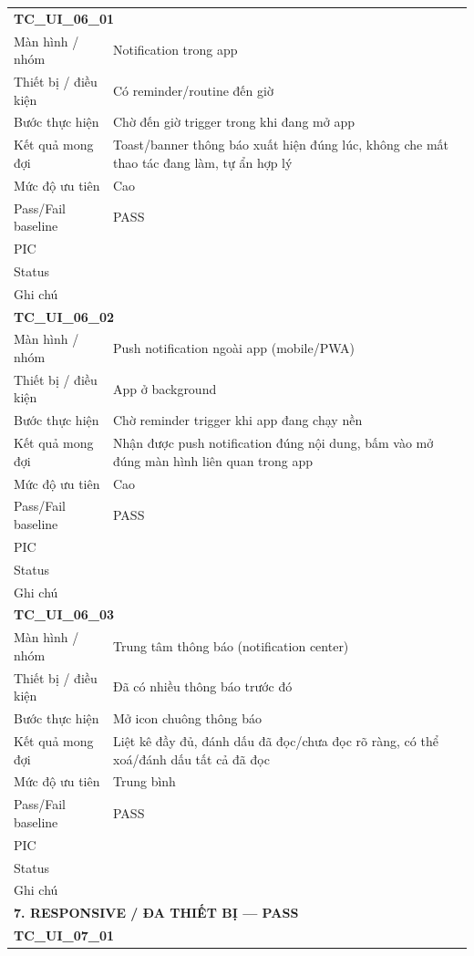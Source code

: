 \documentclass[12pt,a4paper]{article}
\begin{document}
\begin{longtable}{p{3.0cm}p{11.5cm}}
\multicolumn{2}{l}{\textbf{TC\_UI\_06\_01}} \\
Màn hình / nhóm & Notification trong app \\
Thiết bị / điều kiện & Có reminder/routine đến giờ \\
Bước thực hiện & Chờ đến giờ trigger trong khi đang mở app \\
Kết quả mong đợi & Toast/banner thông báo xuất hiện đúng lúc, không che mất thao tác đang làm, tự ẩn hợp lý \\
Mức độ ưu tiên & Cao \\
Pass/Fail baseline & PASS \\
PIC &  \\
Status &  \\
Ghi chú &  \\
\midrule
\multicolumn{2}{l}{\textbf{TC\_UI\_06\_02}} \\
Màn hình / nhóm & Push notification ngoài app (mobile/PWA) \\
Thiết bị / điều kiện & App ở background \\
Bước thực hiện & Chờ reminder trigger khi app đang chạy nền \\
Kết quả mong đợi & Nhận được push notification đúng nội dung, bấm vào mở đúng màn hình liên quan trong app \\
Mức độ ưu tiên & Cao \\
Pass/Fail baseline & PASS \\
PIC &  \\
Status &  \\
Ghi chú &  \\
\midrule
\multicolumn{2}{l}{\textbf{TC\_UI\_06\_03}} \\
Màn hình / nhóm & Trung tâm thông báo (notification center) \\
Thiết bị / điều kiện & Đã có nhiều thông báo trước đó \\
Bước thực hiện & Mở icon chuông thông báo \\
Kết quả mong đợi & Liệt kê đầy đủ, đánh dấu đã đọc/chưa đọc rõ ràng, có thể xoá/đánh dấu tất cả đã đọc \\
Mức độ ưu tiên & Trung bình \\
Pass/Fail baseline & PASS \\
PIC &  \\
Status &  \\
Ghi chú &  \\
\midrule
\multicolumn{2}{l}{\textbf{7. RESPONSIVE / ĐA THIẾT BỊ --- PASS}} \\ \midrule
\multicolumn{2}{l}{\textbf{TC\_UI\_07\_01}} \\

\end{longtable}
\end{document}
